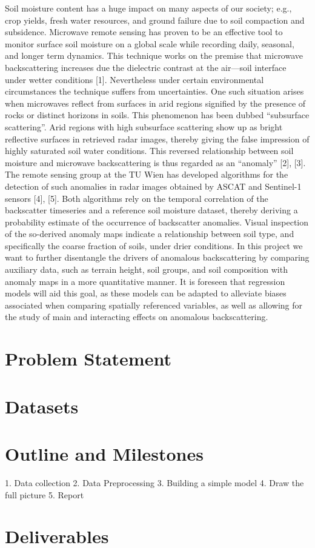 \documentclass[12pt]{article}
\begin{document}
Soil moisture content has a huge impact on many aspects of our society; e.g.,  crop yields, fresh water resources, and ground failure due to soil compaction and subsidence. Microwave remote sensing has proven to be an effective tool to monitor surface soil moisture on a global scale while recording daily, seasonal, and  longer term dynamics. This technique works on the premise that microwave backscattering increases due the dielectric contrast at the air—soil interface under wetter conditions [1]. Nevertheless under certain environmental circumstances the technique suffers from uncertainties. One such situation arises when microwaves reflect from surfaces in arid regions signified by the presence of rocks or distinct horizons in soils. This phenomenon has been dubbed “subsurface scattering”. Arid regions with high subsurface scattering show up as bright reflective surfaces in retrieved radar images, thereby giving the false impression of highly saturated soil water conditions. This reversed relationship between soil moisture and microwave backscattering is thus regarded as an “anomaly” [2], [3]. The remote sensing group at the TU Wien has developed algorithms for the detection of such anomalies in radar images obtained by ASCAT and Sentinel-1 sensors [4], [5]. Both algorithms rely on the temporal correlation of the backscatter timeseries and a reference soil moisture dataset, thereby deriving a probability estimate of the occurrence of backscatter anomalies.  Visual inspection of the so-derived anomaly maps indicate a relationship between soil type, and specifically the coarse fraction of soils, under drier conditions. In this project we want to further disentangle the drivers of anomalous backscattering by comparing auxiliary data, such as terrain height, soil groups, and soil composition with anomaly maps in a more quantitative manner. It is foreseen that regression models will aid this goal, as these models can be adapted to alleviate biases associated when comparing spatially referenced variables, as well as allowing for the study of main and interacting effects on anomalous backscattering.

\section{Problem Statement}

\section{Datasets}

\section{Outline and Milestones}
1. Data collection
2. Data Preprocessing
3. Building a simple model
4. Draw the full picture
5. Report

\section{Deliverables}

\newpage



\end{document}
